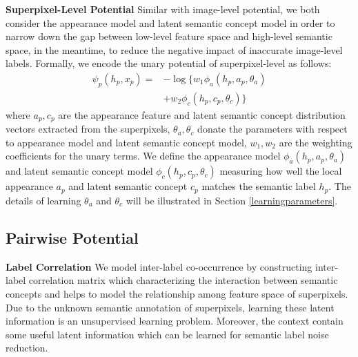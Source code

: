 \textbf{Superpixel-Level Potential}
Similar with image-level potential, we both consider the appearance model and latent semantic concept model in order to narrow down the gap between low-level feature space and high-level semantic space, in the meantime, to reduce the negative impact of inaccurate image-level labels.
Formally, we encode the unary potential of superpixel-level as follows:
\begin{equation}
    \begin{aligned}
        \psi_{p}(h_p,x_p) = &- \log \big\{ w_1\phi_a(h_p,a_p,\theta_a) \\
        &+ w_2\phi_c(h_p,c_p,\theta_c) \big\}
    \end{aligned}
    \label{eq:local}
\end{equation}
where $a_p, c_p$ are the appearance feature and latent semantic concept distribution vectors extracted from the superpixels, $\theta_a, \theta_c$ donate the parameters with respect to appearance model and latent semantic concept model, $w_1,w_2$ are the weighting coefficients for the unary terms.
We define the appearance model $\phi_a(h_p,a_p,\theta_a)$ and latent semantic concept model $\phi_c(h_p,c_p,\theta_c)$ measuring how well the local appearance $a_p$ and latent semantic concept $c_p$ matches the semantic label $h_p$. The details of learning $\theta_a$ and $\theta_c$ will be illustrated in Section \ref{learningparameters}.

\subsection{Pairwise Potential}

\textbf{Label Correlation}
We model inter-label co-occurrence by constructing inter-label correlation matrix which characterizing the interaction between semantic concepts and helps to model the relationship among feature space of superpixels.
Due to the unknown semantic annotation of superpixels, learning these latent information is an unsupervised learning problem.
Moreover, the context contain some useful latent information which can be learned for semantic label noise reduction.


